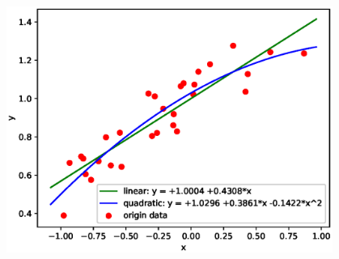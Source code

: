\documentclass[11pt,letter,notitlepage]{article}
\begin{document}
\begin{solution}
\begin{enumerate}
		      \begin{center}
			      \includegraphics[width=0.8\textwidth]{plot1.2.eps}
		      \end{center}

	\end{enumerate}
\end{solution}
\newpage
\end{document}
